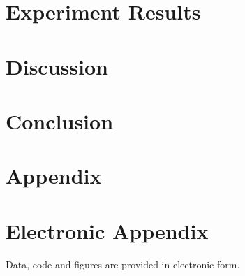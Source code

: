 \documentclass[12pt]{article}
\begin{document}
% 

\section{Experiment Results}
\label{experiment}


\section{Discussion}
\label{discussion}


\section{Conclusion}
\label{concl}


\newpage

    


\setcounter{page}{5}

\appendix

\section{Appendix}
\label{app}
% 
\newpage

\section{Electronic Appendix}
\label{el_app}

Data, code and figures are provided in electronic form.

\newpage
    
\end{document}
